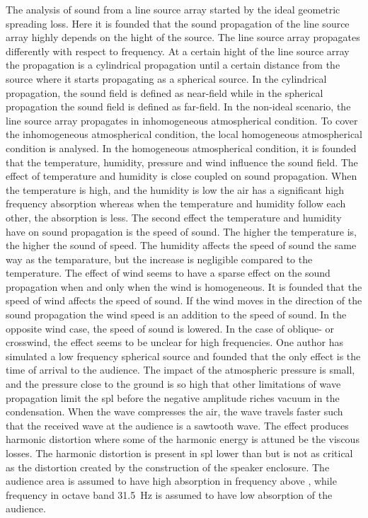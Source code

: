 The analysis of sound from a line source array started by the ideal geometric spreading loss. Here it is founded that the sound propagation of the line source array highly depends on the hight of the source. The line source array propagates differently with respect to frequency. At a certain hight of the line source array the propagation is a cylindrical propagation until a certain distance from the source where it starts propagating as a spherical source. In the cylindrical propagation, the sound field is defined as near-field while in the spherical propagation the sound field is defined as far-field. In the non-ideal scenario, the line source array propagates in inhomogeneous atmospherical condition. To cover the inhomogeneous atmospherical condition, the local homogeneous atmospherical condition is analysed. In the homogeneous atmospherical condition, it is founded that the temperature, humidity, pressure and wind influence the sound field. The effect of temperature and humidity is close coupled on sound propagation. When the temperature is high, and the humidity is low the air has a significant high frequency absorption whereas when the temperature and humidity follow each other, the absorption is less. The second effect the temperature and humidity have on sound propagation is the speed of sound. The higher the temperature is, the higher the sound of speed. The humidity affects the speed of sound the same way as the temparature, but the increase is negligible compared to the temperature. The effect of wind seems to have a sparse effect on the sound propagation when and only when the wind is homogeneous. It is founded that the speed of wind affects the speed of sound. If the wind moves in the direction of the sound propagation the wind speed is an addition to the speed of sound. In the opposite wind case, the speed of sound is lowered. In the case of oblique- or crosswind, the effect seems to be unclear for high frequencies. One author has simulated a low frequency spherical source and founded that the only effect is the time of arrival to the audience.  The impact of the atmospheric pressure is small, and the pressure close to the ground is so high that other limitations of wave propagation limit the \gls{spl} before the negative amplitude riches vacuum in the condensation. When the wave compresses the air, the wave travels faster such that the received wave at the audience is a sawtooth wave. The effect produces harmonic distortion where some of the harmonic energy is attuned be the viscous losses. The harmonic distortion is present in \gls{spl} lower than  but is not as critical as the distortion created by the construction of the speaker enclosure. 
The audience area is assumed to have high absorption in frequency above , while frequency in octave band \SI{31.5}{\hertz} is assumed to have low absorption of the audience. 


